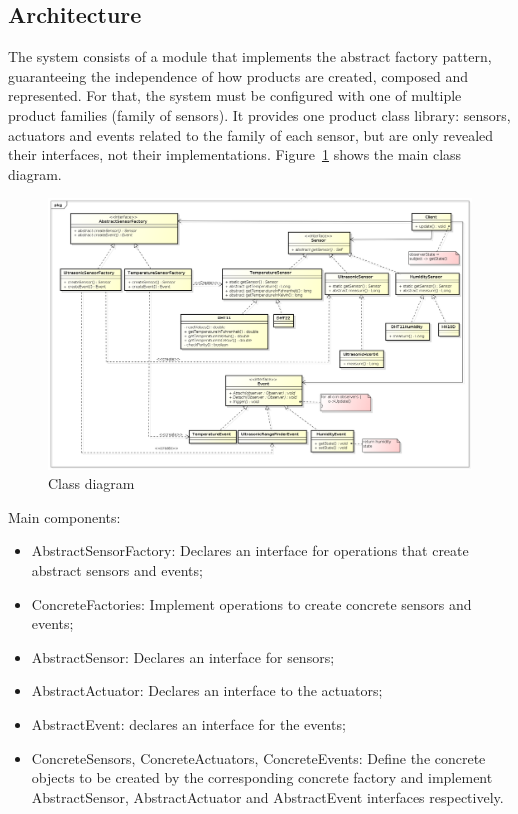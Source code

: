 \documentclass{acm_proc_article-sp}
\begin{document}
\subsection{Architecture}
The system consists of a module that implements the abstract factory pattern, guaranteeing the independence of how products are created, composed and represented. For that, the system must be configured with one of multiple product families (family of sensors). It provides one product class library: sensors, actuators and events related to the family of each sensor, but are only revealed their interfaces, not their implementations. Figure~\ref{fig:classDiagram} shows the main class diagram.
\begin{figure}[ht]
    \includegraphics[width=1.0\textwidth,natwidth=610,natheight=642]{pictures/ClassDiagram.png}
    \caption{Class diagram}
    \label{fig:classDiagram}
\end{figure}
\newline
\newline
Main components:
\begin{itemize}
\item AbstractSensorFactory: Declares an interface for operations that create abstract sensors and events;
\item ConcreteFactories: Implement operations to create concrete sensors and events;
\item AbstractSensor: Declares an interface for sensors;
\item AbstractActuator: Declares an interface to the actuators;
\item AbstractEvent: declares an interface for the events;
\item ConcreteSensors, ConcreteActuators, ConcreteEvents: Define the concrete objects to be created by the corresponding concrete factory and implement AbstractSensor, AbstractActuator and AbstractEvent interfaces respectively.

\end{itemize}
\end{document}
